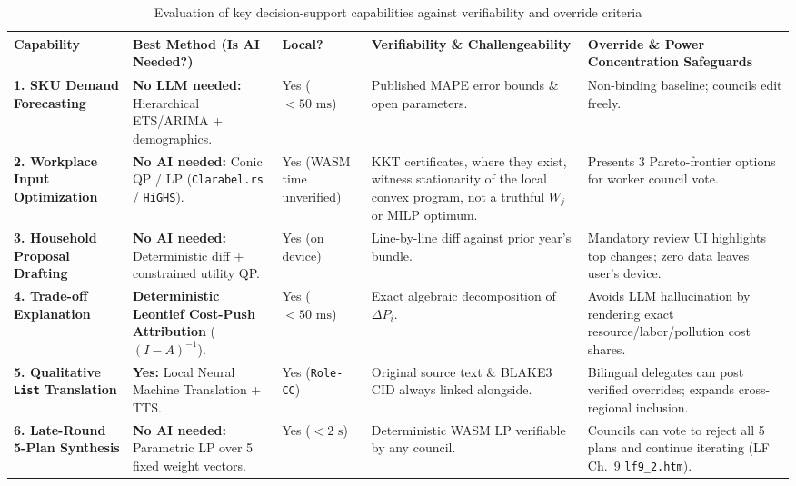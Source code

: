 \documentclass[10pt,twoside,openany]{book}
\theoremstyle{dpepstyle}
\begin{document}
\begin{table}[htbp]
\centering
\caption{Evaluation of key decision-support capabilities against verifiability and override criteria}
\label{tab:ai-eval}
\scriptsize
\setlength{\tabcolsep}{3.2pt}
\begin{tabularx}{\textwidth}{L{0.92in} L{1.02in} C{0.45in} L{1.05in} Y}
\toprule
\textbf{Capability} & \textbf{Best Method (Is AI Needed?)} & \textbf{Local?} & \textbf{Verifiability \& Challengeability} & \textbf{Override \& Power Concentration Safeguards} \\
\midrule
\textbf{1. SKU Demand Forecasting} & \textbf{No LLM needed:} Hierarchical ETS/ARIMA + demographics. & Yes ($<50\text{ ms}$) & Published MAPE error bounds \& open parameters. & Non-binding baseline; councils edit freely. \\
\addlinespace[3pt]
\textbf{2. Workplace Input Optimization} & \textbf{No AI needed:} Conic QP / LP (\texttt{Clarabel.rs} / \texttt{HiGHS}). & Yes (WASM time unverified) & KKT certificates, where they exist, witness stationarity of the local convex program, not a truthful $W_j$ or MILP optimum. & Presents 3 Pareto-frontier options for worker council vote. \\
\addlinespace[3pt]
\textbf{3. Household Proposal Drafting} & \textbf{No AI needed:} Deterministic diff + constrained utility QP. & Yes (on device) & Line-by-line diff against prior year's bundle. & Mandatory review UI highlights top changes; zero data leaves user's device. \\
\addlinespace[3pt]
\textbf{4. Trade-off Explanation} & \textbf{Deterministic Leontief Cost-Push Attribution} ($(I-A)^{-1}$). & Yes ($<50\text{ ms}$) & Exact algebraic decomposition of $\Delta P_i$. & Avoids LLM hallucination by rendering exact resource/labor/pollution cost shares. \\
\addlinespace[3pt]
\textbf{5. Qualitative \texttt{List} Translation} & \textbf{Yes:} Local Neural Machine Translation + TTS. & Yes (\texttt{Role-CC}) & Original source text \& BLAKE3 CID always linked alongside. & Bilingual delegates can post verified overrides; expands cross-regional inclusion. \\
\addlinespace[3pt]
\textbf{6. Late-Round 5-Plan Synthesis} & \textbf{No AI needed:} Parametric LP over 5 fixed weight vectors. & Yes ($<2\text{ s}$) & Deterministic WASM LP verifiable by any council. & Councils can vote to reject all 5 plans and continue iterating (LF Ch.~9 \texttt{lf9\_2.htm}). \\
\bottomrule
\end{tabularx}
\end{table}
\end{document}
